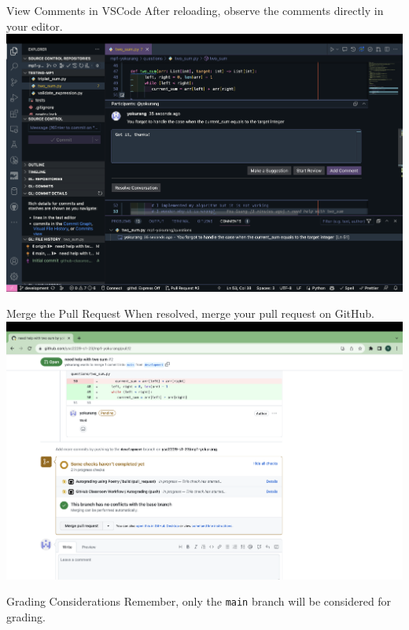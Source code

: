 \documentclass{beamer}
\begin{document}
\begin{frame}{View Comments in VSCode}
    After reloading, observe the comments directly in your editor.
    \includegraphics[width=\textwidth,height=0.7\textheight,keepaspectratio]{assets/check-comments-in-vscode.png}
\end{frame}

\begin{frame}{Merge the Pull Request}
    When resolved, merge your pull request on GitHub.
    \includegraphics[width=\textwidth,height=0.7\textheight,keepaspectratio]{assets/merge-after-done.png}
\end{frame}

\begin{frame}{Grading Considerations}
    \centering
    \large Remember, only the \texttt{main} branch will be considered for grading.
\end{frame}
\end{document}
